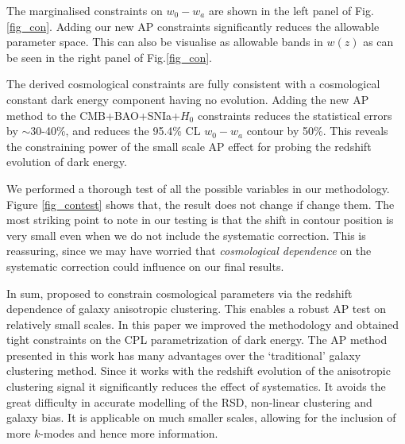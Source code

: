 \documentclass{natureprintstyle}
\begin{document}
The marginalised constraints on $w_0-w_a$ are shown in the left panel of Fig.\ref{fig_con}.
Adding our new AP constraints significantly reduces the allowable parameter space. 
This can also be visualise as allowable bands in $w(z)$ as can be seen in the right panel of Fig.\ref{fig_con}.  

The derived cosmological constraints are fully consistent with a cosmological constant dark energy component having no evolution.
Adding the new AP method to the CMB+BAO+SNIa+$H_0$ constraints reduces the statistical errors by $\sim$30-40\%,
and reduces the 95.4\% CL $w_0-w_a$ contour by 50\%.
This reveals the constraining power of the small scale AP effect for probing the redshift evolution of dark energy.

We performed a thorough test of all the possible variables in our methodology.
Figure \ref{fig_contest} shows that,
the result does not change if change them.
The most striking point to note in our testing is that the 
shift in contour position is very small even when we do not include the systematic correction.
This is reassuring, since we may have worried that {\it cosmological dependence} 
on the systematic correction could influence on our final results. 

In sum, \cite{Li2016} proposed to constrain cosmological parameters via 
the redshift dependence of galaxy anisotropic clustering.
This enables a robust AP test on relatively small scales.
In this paper we improved the methodology and obtained tight constraints on the CPL parametrization of dark energy.
The AP method presented in this work has many advantages over the `traditional' galaxy clustering method.
Since it works with the redshift evolution of the anisotropic clustering signal it significantly reduces the effect of systematics. 
It avoids the great difficulty in accurate modelling of the RSD, non-linear clustering and galaxy bias.
It is applicable on much smaller scales, allowing for the inclusion of more $k$-modes and hence more information. 
\end{document}
